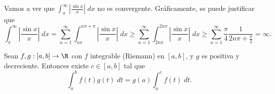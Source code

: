 \begin{eg}
\normalfont Vamos a ver que $\displaystyle \int^{\infty}_{\pi } \left|\frac{\sin x}{x}\right| \; dx $ no es convergente. Gráficamente, se puede justificar que
\[\int^{\infty}_{\pi } \left|\frac{\sin x}{x}\right| \; dx = \sum^{\infty}_{n=1}\int^{n\pi + \pi }_{n\pi } \left|\frac{\sin x}{x}\right| \; dx \geq \sum^{\infty}_{n=1}\int^{2n\pi }_{2n\pi } \left|\frac{\sin x}{x}\right| \; dx \geq \sum^{\infty}_{n=1}\frac{\pi }{4}\frac{1}{2n\pi + \frac{\pi }{2}} = \infty.\]
\end{eg}
\begin{flema}[]
	\normalfont Sean $\displaystyle f,g : \left[a,b\right] \to \R $ con $\displaystyle f $ integrable (Riemann) en $\displaystyle \left[a,b\right]  $, y $\displaystyle g $ es positiva y decreciente. Entonces existe $\displaystyle c \in \left[a,b\right]  $ tal que 
	\[\int^{b}_{a} f\left(t\right)g\left(t\right) \; dt = g\left(a\right)\int^{c}_{a} f\left(t\right) \; dt .\]
\end{flema}
